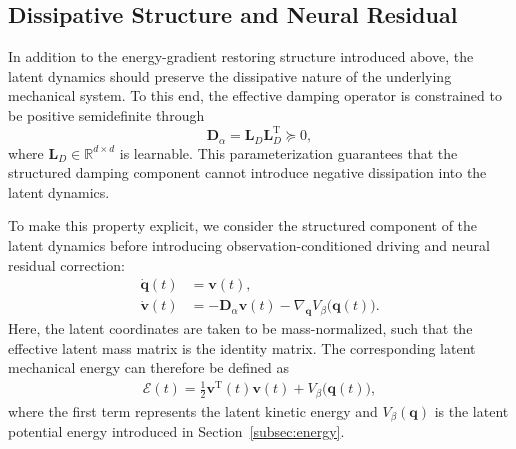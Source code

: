 \documentclass[journal,twoside]{IEEEtran}
\begin{document}
\subsection{Dissipative Structure and Neural Residual}
\label{subsec:residual}

In addition to the energy-gradient restoring structure introduced above, the
latent dynamics should preserve the dissipative nature of the underlying
mechanical system. To this end, the effective damping operator is constrained
to be positive semidefinite through
\begin{equation}
    \mathbf{D}_{\alpha}
    =
    \mathbf{L}_{D}\mathbf{L}_{D}^{\mathrm T}
    \succeq 0,
    \label{eq:damping_constraint}
\end{equation}
where $\mathbf{L}_{D}\in\mathbb{R}^{d\times d}$ is learnable. This
parameterization guarantees that the structured damping component cannot
introduce negative dissipation into the latent dynamics.

To make this property explicit, we consider the structured component of the
latent dynamics before introducing observation-conditioned driving and neural
residual correction:
\begin{equation}
\begin{aligned}
    \dot{\mathbf{q}}(t)
        &= \mathbf{v}(t),\\
    \dot{\mathbf{v}}(t)
        &= -\mathbf{D}_{\alpha}\mathbf{v}(t)
        -\nabla_{\mathbf q}V_{\beta}
        \big(\mathbf q(t)\big).
\end{aligned}
\label{eq:unforced_structured_dynamics}
\end{equation}
Here, the latent coordinates are taken to be mass-normalized, such that the
effective latent mass matrix is the identity matrix. The corresponding latent
mechanical energy can therefore be defined as
\begin{equation}
\begin{aligned}
    \mathcal{E}(t)
    =
    \frac{1}{2}
    \mathbf{v}^{\mathrm T}(t)\mathbf{v}(t)
    +
    V_{\beta}\big(\mathbf q(t)\big),
\end{aligned}
\label{eq:latent_energy}
\end{equation}
where the first term represents the latent kinetic energy and
$V_{\beta}(\mathbf q)$ is the latent potential energy introduced in
Section~\ref{subsec:energy}.
\end{document}
